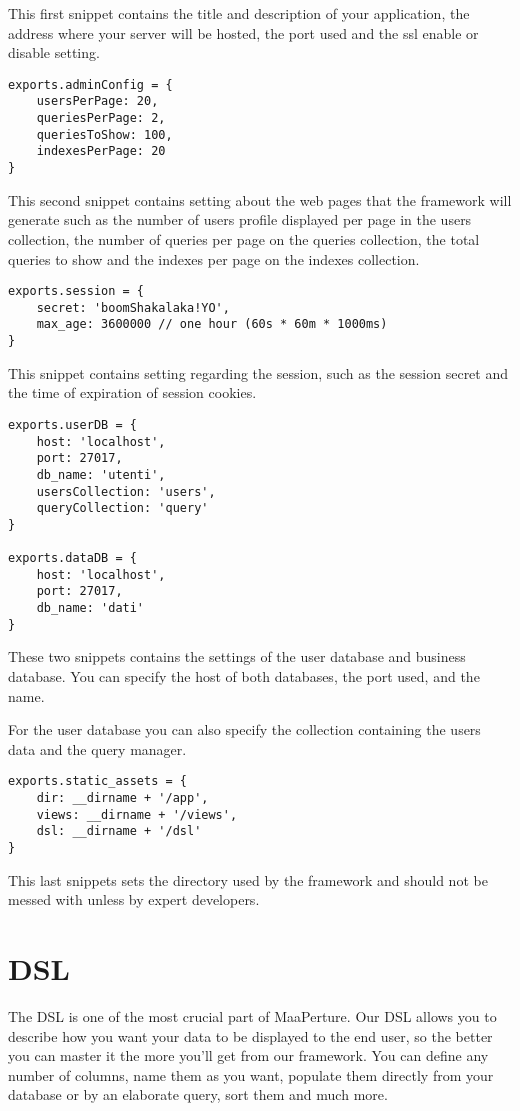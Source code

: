 This first snippet contains the title and description of your application, the address where your server will be hosted, the port used and the ssl enable or disable setting.

\begin{lstlisting}
exports.adminConfig = {
	usersPerPage: 20,
	queriesPerPage: 2,
	queriesToShow: 100,
	indexesPerPage: 20
}
\end{lstlisting}

This second snippet contains setting about the web pages that the framework will generate such as the number of users profile displayed per page in the users collection, the number of queries per page on the queries collection, the total queries to show and the indexes per page on the indexes collection.

\begin{lstlisting}
exports.session = {
	secret: 'boomShakalaka!YO',
	max_age: 3600000 // one hour (60s * 60m * 1000ms)
}
\end{lstlisting}

This snippet contains setting regarding the session, such as the session secret and the time of expiration of session cookies.

\begin{lstlisting}
exports.userDB = {
	host: 'localhost',
	port: 27017,
	db_name: 'utenti',
	usersCollection: 'users',
	queryCollection: 'query'
}

exports.dataDB = {
	host: 'localhost',
	port: 27017,
	db_name: 'dati'
}
\end{lstlisting}

These two snippets contains the settings of the user database and business database.
You can specify the host of both databases, the port used, and the name.

For the user database you can also specify the collection containing the users data and the query manager.


\begin{lstlisting}
exports.static_assets = {
	dir: __dirname + '/app',
	views: __dirname + '/views',
	dsl: __dirname + '/dsl'
}
\end{lstlisting}

This last snippets sets the directory used by the framework and should not be messed with unless by expert developers.

\section{DSL}
The DSL is one of the most crucial part of MaaPerture.
Our DSL allows you to describe how you want your data to be displayed to the end user, so the better you can master it the more you'll get from our framework.
You can define any number of columns, name them as you want, populate them directly from your database or by an elaborate query, sort them and much more.

